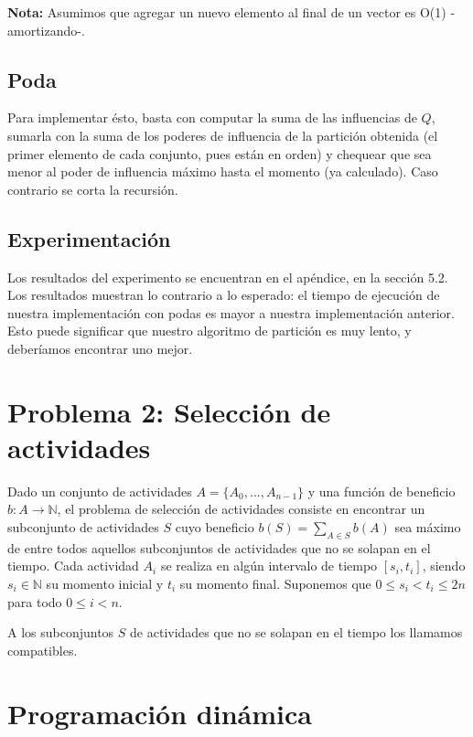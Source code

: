 \documentclass[10pt, a4paper]{article}
\begin{document}
\textbf{Nota:} Asumimos que agregar un nuevo elemento al final de un vector es O(1) -amortizando-.

\subsection{Poda}
Para implementar \'esto, basta con computar la suma de las influencias de $Q$, sumarla con la suma de los poderes de influencia de la partici\'on obtenida (el primer elemento de cada conjunto, pues est\'an en orden) y chequear que sea menor al poder de influencia m\'aximo hasta el momento (ya calculado). Caso contrario se corta la recursi\'on.\\

\subsection{Experimentaci\'on}

Los resultados del experimento se encuentran en el apéndice, en la sección 5.2. Los resultados muestran lo contrario a lo esperado: el tiempo de ejecución de nuestra implementación con podas es mayor a nuestra implementación anterior. Esto puede significar que nuestro algoritmo de partición es muy lento, y deberíamos encontrar uno mejor.

\section*{Problema 2: Selección de actividades}
Dado un conjunto de actividades $A = \{A_0, ... , A_{n-1}\}$ y una función de beneficio $b: A \rightarrow \mathbb{N}$, el problema de selección de actividades consiste en encontrar un subconjunto de actividades $S$ cuyo beneficio $b(S) = \sum_{A \in S} b(A)$ sea máximo de entre todos aquellos subconjuntos de actividades que no se solapan en el tiempo. Cada actividad $A_i$ se realiza en algún intervalo de tiempo $[ s_i , t_i ]$, siendo $s_i \in \mathbb{N}$ su momento inicial y $t_i$ su momento final. Suponemos que $0 \leq s_i < t_i \leq 2n$ para todo $0 \leq i < n$.

A los subconjuntos $S$ de actividades que no se solapan en el tiempo los llamamos compatibles.

\section{Programación dinámica}
\end{document}
